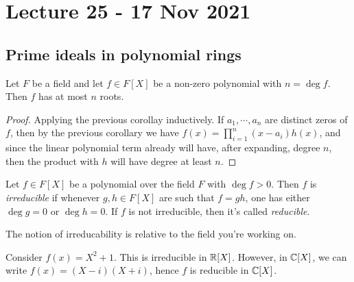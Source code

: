 \section{Lecture 25 - 17 Nov 2021 }
\subsection{Prime ideals in polynomial rings}
\begin{corollary}
  Let $F$ be a field and let $f\in F[X]$ be a non-zero polynomial with $n=\deg f$. Then
  $f$ has at most $n$ roots.
  \label{<+label+>}
\end{corollary}
\begin{proof}
  Applying the previous corollay inductively. If $a_1,\cdots, a_n$ are distinct zeros of
  $f$, then by the previous corollary we have $f(x)=\prod_{i=1}^n (x-a_i) h(x)$, and since
  the linear polynomial term already will have, after expanding, degree $n$, then the
  product with $h$ will have degree at least $n$.
\end{proof}

\begin{definition}
  Let $f\in F[X]$ be a polynomial over the field $F$ with $\deg f>0$. Then $f$ is
  \emph{irreducible} if whenever $g,h\in F[X]$ are such that $f=gh$, one has either $\deg
  g=0$ or $\deg h=0$. If $f$ is not irreducible, then it's called \emph{reducible}.
\end{definition}
\begin{remark}
  The notion of irreducability is relative to the field you're working on.
\end{remark}
\begin{example}
  Consider $f(x)=X^2+1$. This is irreducible in $\mathbb R[X]$. However, in $\mathbb C[X]$, we can
  write $f(x)=(X-i)(X+i)$, hence $f$ is reducible in $\mathbb C[X]$.
\end{example}


